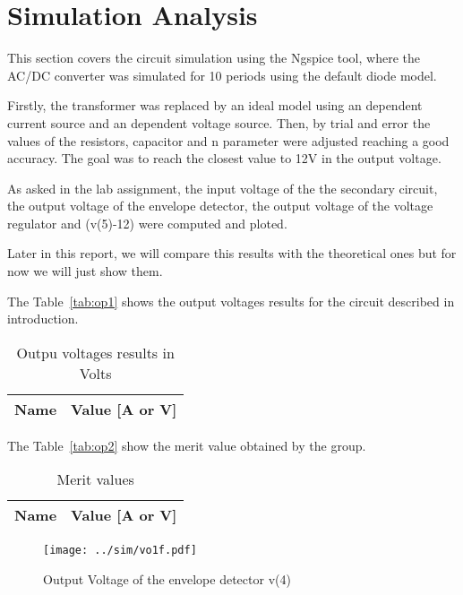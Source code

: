 \section{Simulation Analysis}
\label{sec:simulation}

\hspace{0,5cm} This section covers the circuit simulation using the Ngspice tool, where the AC/DC converter was simulated for 10 periods using the default diode model.
\par Firstly, the transformer was replaced by an ideal model using an dependent current source and an dependent voltage source. Then, by trial and error the values of the resistors, capacitor and n parameter were adjusted reaching a good accuracy. The goal was to reach the closest value to 12V in the output voltage.
\par As asked in the lab assignment, the input voltage of the the secondary circuit, the output voltage of the envelope detector, the output voltage of the voltage regulator and (v(5)-12) were computed and ploted.
\par Later in this report, we will compare this results with the theoretical ones but for now we will just show them.

The Table~\ref{tab:op1} shows the output voltages results for the circuit described in introduction.

\begin{table}[!ht]
  \centering
  \begin{tabular}{|l|r|}
    \hline    
    {\bf Name} & {\bf Value [A or V]} \\ \hline
    
  \end{tabular}
  \caption{Outpu voltages results in Volts}
  \label{tab:ngs1}
\end{table}

The Table~\ref{tab:op2} show the merit value obtained by the group.
\begin{table}[!ht]
  \centering
  \begin{tabular}{|l|r|}
    \hline    
    {\bf Name} & {\bf Value [A or V]} \\ \hline
    
  \end{tabular}
  \caption{Merit values}
  \label{tab:ng2}
\end{table}

\begin{figure}[ht!] \centering
\texttt{[image: ../sim/vo1f.pdf]}
\caption{Output Voltage of the envelope detector v(4)} 
\label{fig:sim1}
\end{figure}

